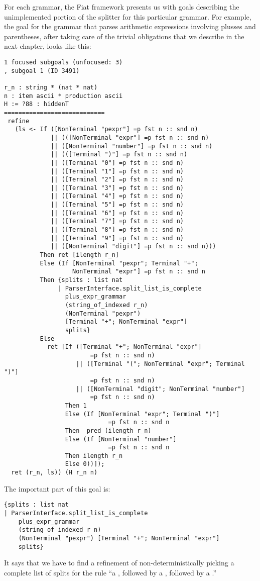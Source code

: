       
    For each grammar, the Fiat framework presents us with goals describing the unimplemented portion of the splitter for this particular grammar.  For example, the goal for the grammar that parses arithmetic expressions involving plusses and parentheses, after taking care of the trivial obligations that we describe in the next chapter, looks like this:\label{sec:after-if-folding-num-+-paren}
\begin{verbatim}
1 focused subgoals (unfocused: 3)
, subgoal 1 (ID 3491)
  
r_n : string * (nat * nat)
n : item ascii * production ascii
H := ?88 : hiddenT
============================
 refine
   (ls <- If ([NonTerminal "pexpr"] =p fst n :: snd n)
             || (([NonTerminal "expr"] =p fst n :: snd n)
             || ([NonTerminal "number"] =p fst n :: snd n)
             || (([Terminal ")"] =p fst n :: snd n)
             || ([Terminal "0"] =p fst n :: snd n)
             || ([Terminal "1"] =p fst n :: snd n)
             || ([Terminal "2"] =p fst n :: snd n)
             || ([Terminal "3"] =p fst n :: snd n)
             || ([Terminal "4"] =p fst n :: snd n)
             || ([Terminal "5"] =p fst n :: snd n)
             || ([Terminal "6"] =p fst n :: snd n)
             || ([Terminal "7"] =p fst n :: snd n)
             || ([Terminal "8"] =p fst n :: snd n)
             || ([Terminal "9"] =p fst n :: snd n)
             || ([NonTerminal "digit"] =p fst n :: snd n)))
          Then ret [ilength r_n]
          Else (If [NonTerminal "pexpr"; Terminal "+";
                   NonTerminal "expr"] =p fst n :: snd n
          Then {splits : list nat
               | ParserInterface.split_list_is_complete
                 plus_expr_grammar
                 (string_of_indexed r_n)
                 (NonTerminal "pexpr")
                 [Terminal "+"; NonTerminal "expr"]
                 splits}
          Else
            ret [If ([Terminal "+"; NonTerminal "expr"]
                        =p fst n :: snd n)
                    || ([Terminal "("; NonTerminal "expr"; Terminal ")"]
                        =p fst n :: snd n)
                    || ([NonTerminal "digit"; NonTerminal "number"]
                        =p fst n :: snd n)
                 Then 1
                 Else (If [NonTerminal "expr"; Terminal ")"]
                             =p fst n :: snd n 
                 Then  pred (ilength r_n)
                 Else (If [NonTerminal "number"]
                             =p fst n :: snd n 
                 Then ilength r_n
                 Else 0))]);
  ret (r_n, ls)) (H r_n n)
\end{verbatim}
     The important part of this goal is:
\begin{verbatim}
{splits : list nat
| ParserInterface.split_list_is_complete
    plus_expr_grammar
    (string_of_indexed r_n)
    (NonTerminal "pexpr") [Terminal "+"; NonTerminal "expr"]
    splits}
\end{verbatim}
     It says that we have to find a refinement of non-deterministically picking a complete list of splits for the rule ``a , followed by a \terminal{+}, followed by a .''
     
